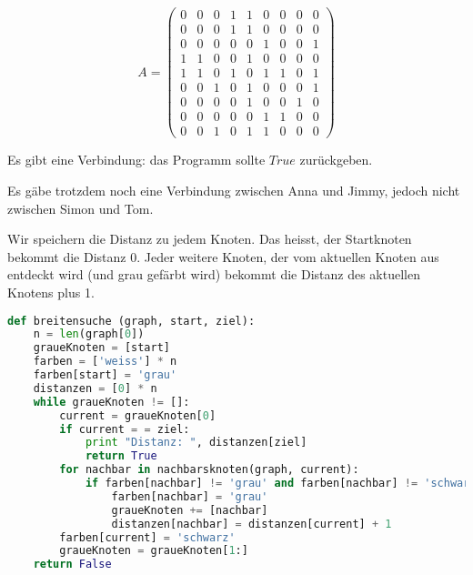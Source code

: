 \begin{lsg}
\[A =  \begin{pmatrix}
  0 & 0 & 0 & 1 & 1 & 0 & 0 & 0 & 0  \\
  0 & 0 & 0 & 1 & 1 & 0 & 0 & 0 & 0  \\
  0 & 0 & 0 & 0 & 0 & 1 & 0 & 0 & 1  \\
  1 & 1 & 0 & 0 & 1 & 0 & 0 & 0 & 0  \\
  1 & 1 & 0 & 1 & 0 & 1 & 1 & 0 & 1  \\
  0 & 0 & 1 & 0 & 1 & 0 & 0 & 0 & 1  \\
  0 & 0 & 0 & 0 & 1 & 0 & 0 & 1 & 0  \\
  0 & 0 & 0 & 0 & 0 & 1 & 1 & 0 & 0  \\
  0 & 0 & 1 & 0 & 1 & 1 & 0 & 0 & 0 
 \end{pmatrix}
  \]
\end{lsg}

\begin{lsg}
Es gibt eine Verbindung: das Programm sollte $True$ zur\"uckgeben.
\end{lsg}

\begin{lsg}
Es g\"abe trotzdem noch eine Verbindung zwischen Anna und Jimmy, jedoch nicht zwischen Simon und Tom.
\end{lsg}

\begin{lsg}
Wir speichern die Distanz zu jedem Knoten. Das heisst, der Startknoten bekommt die Distanz 0. Jeder weitere Knoten, der vom aktuellen Knoten aus entdeckt wird (und grau gef\"arbt wird) bekommt die Distanz des aktuellen Knotens plus 1.
\end{lsg}

\begin{lsg}
\hfill
\begin{lstlisting}[language=Python,basicstyle=\small,tabsize=3]
def breitensuche (graph, start, ziel):
	n = len(graph[0])
	graueKnoten = [start]
	farben = ['weiss'] * n
	farben[start] = 'grau'
	distanzen = [0] * n
	while graueKnoten != []:
		current = graueKnoten[0]
		if current = = ziel:
			print "Distanz: ", distanzen[ziel]
			return True
		for nachbar in nachbarsknoten(graph, current):
			if farben[nachbar] != 'grau' and farben[nachbar] != 'schwarz':
				farben[nachbar] = 'grau'
				graueKnoten += [nachbar]
				distanzen[nachbar] = distanzen[current] + 1
		farben[current] = 'schwarz'
		graueKnoten = graueKnoten[1:]
	return False
\end{lstlisting}
\end{lsg}

